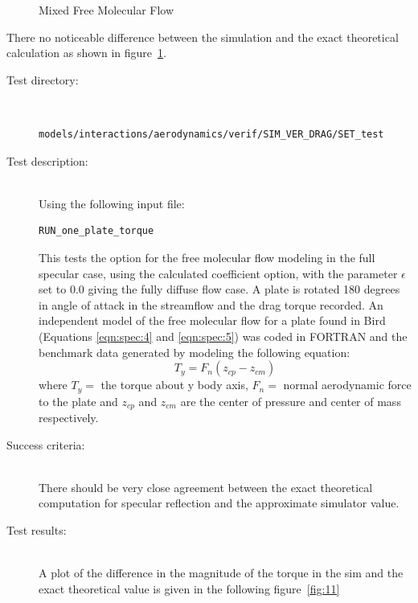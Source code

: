 \begin{description}
\begin{figure}[hbpt]
\caption{Mixed Free Molecular Flow}
\label{fig:9}
\end{figure}
There no noticeable difference between the simulation and the exact theoretical
calculation as shown in figure~\ref{fig:9}.
\end{description}


\label{test:torque}
\begin{description}
\item[Test directory:] \
\begin{verbatim}models/interactions/aerodynamics/verif/SIM_VER_DRAG/SET_test\end{verbatim}
\item[Test description:] \ \\
Using the following input file:
\begin{verbatim}RUN_one_plate_torque\end{verbatim}
This tests the option for the free molecular flow
modeling in the full specular case, using the calculated coefficient option,
with the
parameter $\epsilon$ set to 0.0 giving the fully diffuse flow case. A
plate is rotated 180 degrees in angle of attack in the streamflow
and the drag torque recorded. An independent model of the free molecular flow
for a plate found in Bird~\cite{Bird} (Equations \ref{eqn:spec:4} and \ref{eqn:spec:5}) was coded in
FORTRAN and the benchmark data generated by modeling the following equation:
\begin{equation}
T_y  = F_n (z_{cp}  - z_{cm})
\end{equation}
where
$T_y =$ the torque about y body axis, $F_n =$ normal aerodynamic force to
the plate and $z_{cp}$ and $z_{cm}$ are the center of pressure and center
of mass respectively.
\item[Success criteria:] \ \\
There should be very close agreement between the exact theoretical
computation for specular reflection and the approximate simulator value.
\item[Test results:] \ \\
A plot of the difference in the magnitude of the torque in the sim and the
exact theoretical value is given in the following figure~\ref{fig:11}
\begin{figure}[hbpt]

\end{figure}
\end{description}
